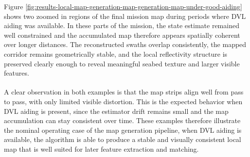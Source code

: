 \newpage

\noindent
Figure \ref{fig:results-local-map-generation-map-generation-map-under-good-aiding} shows two zoomed in regions of the final mission map during periods where DVL aiding was available. In these parts of the mission, the state estimate remained well constrained and the accumulated map therefore appears spatially coherent over longer distances. The reconstructed swaths overlap consistently, the mapped corridor remains geometrically stable, and the local reflectivity structure is preserved clearly enough to reveal meaningful seabed texture and larger visible features.
\\ \\
A clear observation in both examples is that the map strips align well from pass to pass, with only limited visible distortion. This is the expected behavior when DVL aiding is present, since the estimator drift remains small and the map accumulation can stay consistent over time. These examples therefore illustrate the nominal operating case of the map generation pipeline, when DVL aiding is available, the algorithm is able to produce a stable and visually consistent local map that is well suited for later feature extraction and matching.

\newpage

